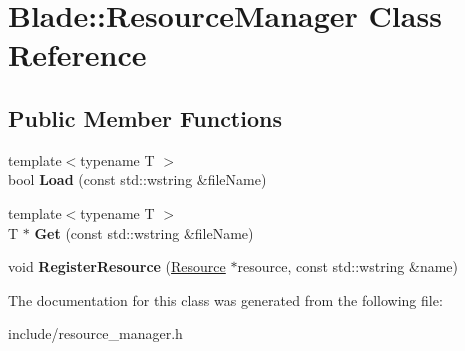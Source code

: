 \hypertarget{class_blade_1_1_resource_manager}{}\section{Blade\+:\+:Resource\+Manager Class Reference}
\label{class_blade_1_1_resource_manager}
\subsection*{Public Member Functions}
\begin{DoxyCompactItemize}
\item 
\mbox{\label{class_blade_1_1_resource_manager_ad99695e0e3d6cf66e3645b61dcede9b8}} 
{\footnotesize template$<$typename T $>$ }\\bool {\bfseries Load} (const std\+::wstring \&file\+Name)
\item 
\mbox{\label{class_blade_1_1_resource_manager_a84e678264f844a6b4bca8d46ee16336b}} 
{\footnotesize template$<$typename T $>$ }\\T $\ast$ {\bfseries Get} (const std\+::wstring \&file\+Name)
\item 
\mbox{\label{class_blade_1_1_resource_manager_aa406f90716a7758669b424a290549256}} 
void {\bfseries Register\+Resource} (\hyperlink{class_blade_1_1_resource}{Resource} $\ast$resource, const std\+::wstring \&name)
\end{DoxyCompactItemize}


The documentation for this class was generated from the following file\+:\begin{DoxyCompactItemize}
\item 
include/resource\+\_\+manager.\+h\end{DoxyCompactItemize}
